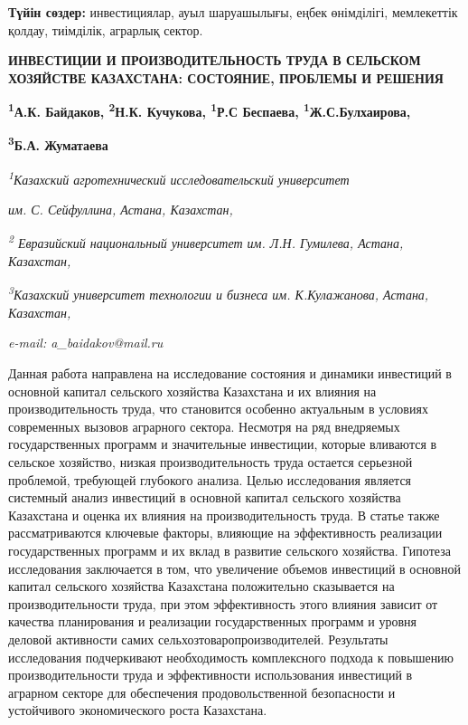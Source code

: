 {{{\bfseries Түйін сөздер:} инвестициялар, ауыл шаруашылығы, еңбек
өнімділігі, мемлекеттік қолдау, тиімділік, аграрлық сектор.

{\bfseries ИНВЕСТИЦИИ И ПРОИЗВОДИТЕЛЬНОСТЬ ТРУДА В СЕЛЬСКОМ ХОЗЯЙСТВЕ
КАЗАХСТАНА: СОСТОЯНИЕ, ПРОБЛЕМЫ И РЕШЕНИЯ}

{\bfseries \textsuperscript{1}А.К. Байдаков\textsuperscript{\envelope },
\textsuperscript{2}Н.К. Кучукова, \textsuperscript{1}Р.С Беспаева,
\textsuperscript{1}Ж.С.Булхаирова,}

{\bfseries \textsuperscript{3}Б.А. Жуматаева}

\emph{\textsuperscript{1}Казахский агротехнический исследовательский
университет}

\emph{им. С. Сейфуллина, Астана, Казахстан,}

\emph{\textsuperscript{2} Евразийский национальный университет им. Л.Н.
Гумилева, Астана, Казахстан,}

\emph{\textsuperscript{3}Казахский университет технологии и бизнеса им.
К.Кулажанова, Астана, Казахстан,}

\emph{e-mail: a\_baidakov@mail.ru}

Данная работа направлена на исследование состояния и динамики инвестиций
в основной капитал сельского хозяйства Казахстана и их влияния на
производительность труда, что становится особенно актуальным в условиях
современных вызовов аграрного сектора. Несмотря на ряд внедряемых
государственных программ и значительные инвестиции, которые вливаются в
сельское хозяйство, низкая производительность труда остается серьезной
проблемой, требующей глубокого анализа. Целью исследования является
системный анализ инвестиций в основной капитал сельского хозяйства
Казахстана и оценка их влияния на производительность труда. В статье
также рассматриваются ключевые факторы, влияющие на эффективность
реализации государственных программ и их вклад в развитие сельского
хозяйства. Гипотеза исследования заключается в том, что увеличение
объемов инвестиций в основной капитал сельского хозяйства Казахстана
положительно сказывается на производительности труда, при этом
эффективность этого влияния зависит от качества планирования и
реализации государственных программ и уровня деловой активности самих
сельхозтоваропроизводителей. Результаты исследования подчеркивают
необходимость комплексного подхода к повышению производительности труда
и эффективности использования инвестиций в аграрном секторе для
обеспечения продовольственной безопасности и устойчивого экономического
роста Казахстана.

}}
